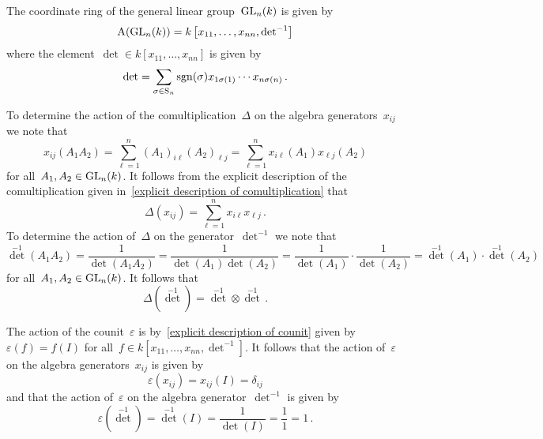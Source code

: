 \begin{example}
  The coordinate ring of the general linear group~$\operatorname{GL}_n(k)$ is given by
  \[
      \operatorname{A}(\operatorname{GL}_n(k))
    = k\left[ x_{11}, \dotsc, x_{nn}, \operatorname{det}^{-1} \right]
  \]
  where the element~$\det \in k[x_{11}, \dotsc, x_{nn}]$ is given by
  \[
      \operatorname{det}
    = \sum_{\sigma \in \operatorname{S}_n} \operatorname{sgn}(\sigma) x_{1\sigma(1)} \dotsm x_{n\sigma(n)} \,.
  \]
  
  To determine the action of the comultiplication~$\Delta$ on the algebra generators~$x_{ij}$ we note that
  \[
      x_{ij}(A_1 A_2)
    = \sum_{\ell=1}^n (A_1)_{i \ell} (A_2)_{\ell j}
    = \sum_{\ell=1}^n x_{i \ell}(A_1) x_{\ell j}(A_2)
  \]
  for all~$A_1, A_2 \in \operatorname{GL}_n(k)$.
  It follows from the explicit description of the comultiplication given in~\eqref{explicit description of comultiplication} that
  \[
      \Delta(x_{ij})
    = \sum_{\ell = 1}^n x_{i \ell} x_{\ell j} \,.
  \]
  To determine the action of~$\Delta$ on the generator~$\det^{-1}$ we note that
  \[
      \det^{-1}(A_1 A_2)
    = \frac{1}{\det(A_1 A_2)}
    = \frac{1}{\det(A_1) \det(A_2)}
    = \frac{1}{\det(A_1)} \cdot \frac{1}{\det(A_2)}
    = \det^{-1}(A_1) \cdot \det^{-1}(A_2)
  \]
  for all~$A_1, A_2 \in \operatorname{GL}_n(k)$.
  It follows that
  \[
      \Delta\left( \det^{-1} \right)
    = \det^{-1} \otimes \det^{-1} \,.
  \]
  
  The action of the counit~$\varepsilon$ is by~\eqref{explicit description of counit} given by~$\varepsilon(f) = f(I)$ for all~$f \in k[x_{11}, \dotsc, x_{nn}, \det^{-1}]$.
  It follows that the action of~$\varepsilon$ on the algebra generators~$x_{ij}$ is given by
  \[
      \varepsilon(x_{ij})
    = x_{ij}(I)
    = \delta_{ij}
  \]
  and that the action of~$\varepsilon$ on the algebra generator~$\det^{-1}$ is given by
  \[
      \varepsilon\left( \det^{-1} \right)
    = \det^{-1}(I)
    = \frac{1}{\det(I)}
    = \frac{1}{1}
    = 1 \,.
  \]
  

\end{example}
